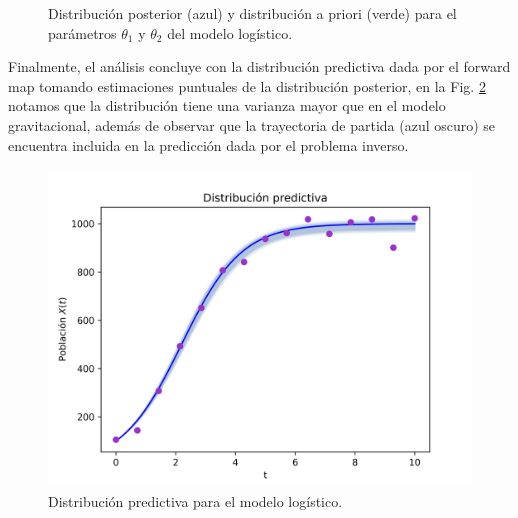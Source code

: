 \begin{figure}
    \centering
    \qquad
    \caption{Distribución posterior (azul) y distribución a priori (verde) para el parámetros $\theta_1$ y $\theta_2$ del modelo logístico.}
    \label{Fig. 3.2.log.theta}
\end{figure}

Finalmente, el análisis concluye con la distribución predictiva dada por el forward map tomando estimaciones puntuales de la distribución posterior, en la Fig. \ref{Fig. 3.2.log.predictiva} notamos que la distribución tiene una varianza mayor que en el modelo gravitacional, además de observar que la trayectoria de partida (azul oscuro) se encuentra incluida en la predicción dada por el problema inverso.

\begin{figure}
    \centering 
    \includegraphics[width = 10 cm ]{img/Exp_Central_logistico_sigma/Figuras/Generales/Predictiva_logistico_sigma.png} 
    \caption{Distribución predictiva para el modelo logístico.}
    \label{Fig. 3.2.log.predictiva}
\end{figure} 


